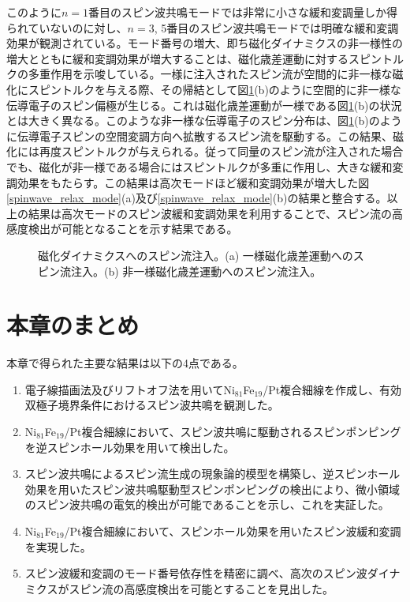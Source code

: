 このように$n=1$番目のスピン波共鳴モードでは非常に小さな緩和変調量しか得られていないのに対し、$n=3$, 5番目のスピン波共鳴モードでは明確な緩和変調効果が観測されている。モード番号の増大、即ち磁化ダイナミクスの非一様性の増大とともに緩和変調効果が増大することは、磁化歳差運動に対するスピントルクの多重作用を示唆している。一様に注入されたスピン流が空間的に非一様な磁化にスピントルクを与える際、その帰結として図\ref{spatially}(b)のように空間的に非一様な伝導電子のスピン偏極が生じる。これは磁化歳差運動が一様である図\ref{spatially}(b)の状況とは大きく異なる。このような非一様な伝導電子のスピン分布は、図\ref{spatially}(b)のように伝導電子スピンの空間変調方向へ拡散するスピン流を駆動する。この結果、磁化には再度スピントルクが与えられる。従って同量のスピン流が注入された場合でも、磁化が非一様である場合にはスピントルクが多重に作用し、大きな緩和変調効果をもたらす。この結果は高次モードほど緩和変調効果が増大した図\ref{spinwave_relax_mode}(a)及び\ref{spinwave_relax_mode}(b)の結果と整合する。以上の結果は高次モードのスピン波緩和変調効果を利用することで、スピン流の高感度検出が可能となることを示す結果である。




\begin{figure}[tbp]
 \begin{center}
 \end{center}
 \caption{磁化ダイナミクスへのスピン流注入。(a) 一様磁化歳差運動へのスピン流注入。(b) 非一様磁化歳差運動へのスピン流注入。}
 \label{spatially}
\end{figure}







\section{本章のまとめ}
本章で得られた主要な結果は以下の4点である。
\begin{enumerate}
 \item 電子線描画法及びリフトオフ法を用いてNi$_{81}$Fe$_{19}$/Pt複合細線を作成し、有効双極子境界条件におけるスピン波共鳴を観測した。
 \item Ni$_{81}$Fe$_{19}$/Pt複合細線において、スピン波共鳴に駆動されるスピンポンピングを逆スピンホール効果を用いて検出した。
 \item スピン波共鳴によるスピン流生成の現象論的模型を構築し、逆スピンホール効果を用いたスピン波共鳴駆動型スピンポンピングの検出により、微小領域のスピン波共鳴の電気的検出が可能であることを示し、これを実証した。
 \item Ni$_{81}$Fe$_{19}$/Pt複合細線において、スピンホール効果を用いたスピン波緩和変調を実現した。
 \item スピン波緩和変調のモード番号依存性を精密に調べ、高次のスピン波ダイナミクスがスピン流の高感度検出を可能とすることを見出した。
\end{enumerate}


